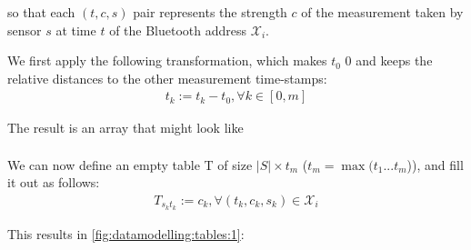 so that each $(t,c,s)$ pair represents the strength $c$ of the measurement taken by sensor $s$ at time $t$ of the Bluetooth address $\mathcal{X}_i$.\\

\par
We first apply the following transformation, which makes $t_0$ 0 and keeps the relative distances to the other measurement time-stamps:
\begin{align*}
	t_k := t_k-t_0, \forall k \in [0,m]
\end{align*}

The result is an array that might look like
\begin{align*}
    [(0,-80,S1), (3,-60,S1), (3,-70,S2), (5,-60,S3), \\
    (6,-30,S1), (7,-30,S2), (9,-80,S1), (10,-70,S3)]
\end{align*}

We can now define an empty table T of size $|S| \times t_m$ ($t_m = \max (t_1...t_m$)), and fill it out as follows:
\begin{align*}
    T_{s_kt_k} := c_k, \forall (t_k, c_k, s_k) \in \mathcal{X}_i
\end{align*}

This results in \cref{fig:datamodelling:tables:1}:

